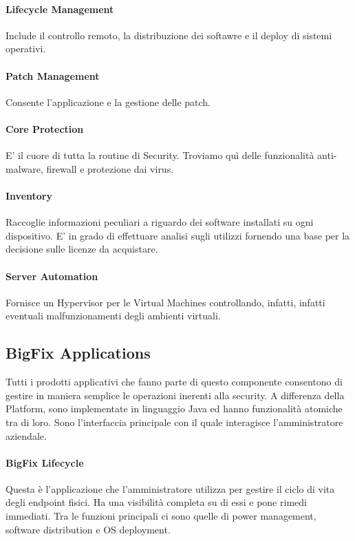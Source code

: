 \paragraph{Lifecycle Management}
Include il controllo remoto, la distribuzione dei softawre e il deploy di sistemi operativi.
\paragraph{Patch Management}
Consente l'applicazione e la gestione delle patch.
\paragraph{Core Protection}
E' il cuore di tutta la routine di Security. Troviamo quì delle funzionalità anti-malware, firewall e protezione dai virus.
\paragraph{Inventory }
Raccoglie informazioni peculiari a riguardo dei software installati su ogni dispositivo. E' in grado di effettuare analisi sugli utilizzi fornendo una base per la decisione sulle licenze da acquistare.
\paragraph{Server Automation}
Fornisce un Hypervisor per le Virtual Machines controllando, infatti, infatti eventuali malfunzionamenti degli ambienti virtuali.

\subsection{BigFix Applications}
Tutti i prodotti applicativi che fanno parte di questo componente consentono di gestire in maniera semplice le operazioni inerenti alla security. A differenza della Platform, sono implementate in linguaggio Java ed hanno funzionalità atomiche tra di loro. Sono l'interfaccia principale con il quale interagisce l'amministratore aziendale.

\paragraph{BigFix Lifecycle}
Questa è l'applicazione che l'amministratore utilizza per gestire il ciclo di vita degli endpoint fisici. Ha una visibilità completa su di essi e pone rimedi immediati. Tra le funzioni principali ci sono quelle di power management, software distribution e OS deployment. 
